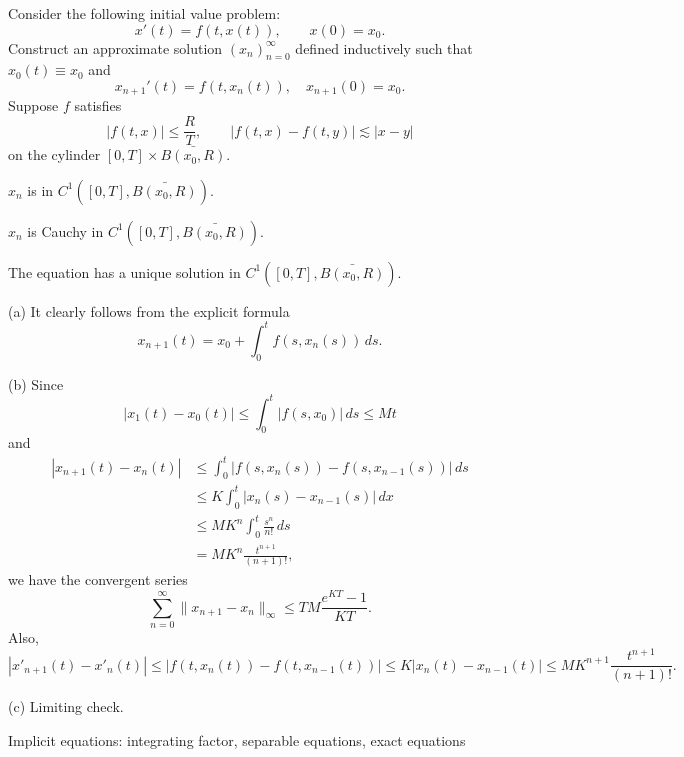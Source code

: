 \documentclass{../../large}
\begin{document}
\begin{prb}
Consider the following initial value problem:
\[x'(t)=f(t,x(t)),\qquad x(0)=x_0.\]
Construct an approximate solution $(x_n)_{n=0}^\infty$ defined inductively such that $x_0(t)\equiv x_0$ and
\[x_{n+1}'(t)=f(t,x_n(t)),\quad x_{n+1}(0)=x_0.\]
Suppose $f$ satisfies
\[|f(t,x)|\le \frac RT,\qquad|f(t,x)-f(t,y)|\lesssim|x-y|\]
on the cylinder $[0,T]\times\bar{B(x_0,R)}$.
\begin{parts}
\item $x_n$ is in $C^1([0,T],\bar{B(x_0,R)})$.
\item $x_n$ is Cauchy in $C^1([0,T],\bar{B(x_0,R)})$.
\item The equation has a unique solution in $C^1([0,T],\bar{B(x_0,R)})$.
\end{parts}
\end{prb}
\begin{pf}
(a)
It clearly follows from the explicit formula
\[x_{n+1}(t)=x_0+\int_0^tf(s,x_n(s))\,ds.\]

(b)
Since
\[|x_1(t)-x_0(t)|\le\int_0^t|f(s,x_0)|\,ds\le Mt\]
and
\begin{align*}
|x_{n+1}(t)-x_n(t)|
&\le\int_0^t|f(s,x_n(s))-f(s,x_{n-1}(s))|\,ds\\
&\le K\int_0^t|x_n(s)-x_{n-1}(s)|\,dx\\
&\le MK^n\int_0^t\frac{s^n}{n!}\,ds\\
&=MK^n\frac{t^{n+1}}{(n+1)!},
\end{align*}
we have the convergent series
\[\sum_{n=0}^\infty\|x_{n+1}-x_n\|_\infty\le TM\frac{e^{KT}-1}{KT}.\]
Also,
\[|x'_{n+1}(t)-x'_n(t)|\le|f(t,x_n(t))-f(t,x_{n-1}(t))|\le K|x_n(t)-x_{n-1}(t)|\le MK^{n+1}\frac{t^{n+1}}{(n+1)!}.\]

(c)
Limiting check.
\end{pf}

\begin{prb}
\end{prb}

\begin{prb}
\end{prb}


Implicit equations:
integrating factor, separable equations, exact equations


\begin{prb}

\end{prb}
\begin{prb}

\end{prb}
\end{document}
